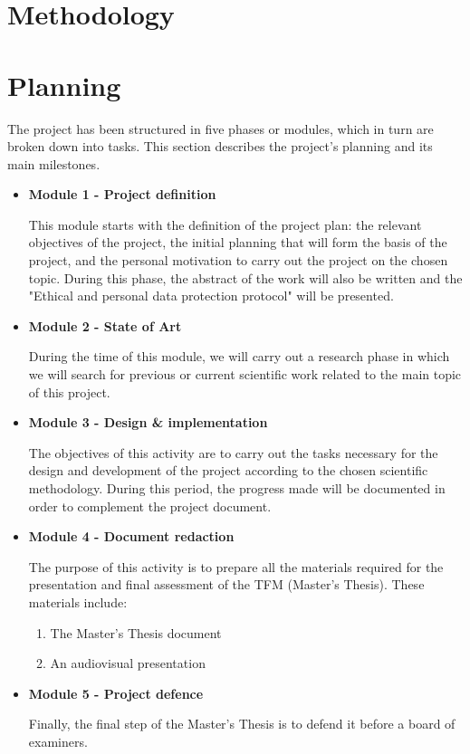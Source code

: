 \section{Methodology}


\section{Planning}

The project has been structured in five phases or modules, which in turn are broken down into tasks. This section describes the project's planning and its main milestones. 
\begin{itemize}
    \item \textbf{Module 1 - Project definition} 
    
    This module starts with the definition of the project plan: the relevant objectives of the project, the initial planning that will form the basis of the project, and the personal motivation to carry out the project on the chosen topic. During this phase, the abstract of the work will also be written and the "Ethical and personal data protection protocol" will be presented.
    \item \textbf{Module 2 - State of Art}
    
    During the time of this module, we will carry out a research phase in which we will search for previous or current scientific work related to the main topic of this project.
    \item \textbf{Module 3 - Design \& implementation}
    
    The objectives of this activity are to carry out the tasks necessary for the design and development of the project according to the chosen scientific methodology. During this period, the progress made will be documented in order to complement the project document. 
    \item \textbf{Module 4 - Document redaction}
    
    The purpose of this activity is to prepare all the materials required for the presentation and final assessment of the TFM (Master's Thesis). These materials include:
    
    \begin{enumerate}
        \item The Master's Thesis document
        \item An audiovisual presentation
    \end{enumerate}

    \item \textbf{Module 5 - Project defence}
    
    Finally, the final step of the Master's Thesis is to defend it before a board of examiners.
\end{itemize}

